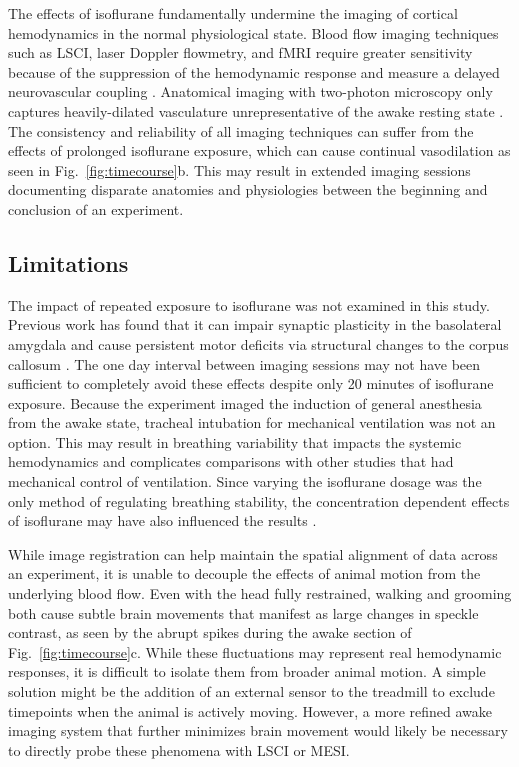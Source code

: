 \documentclass[review]{elsarticle}
\begin{document}
The effects of isoflurane fundamentally undermine the imaging of cortical hemodynamics in the normal physiological state. Blood flow imaging techniques such as LSCI, laser Doppler flowmetry, and fMRI require greater sensitivity because of the suppression of the hemodynamic response \cite{Takuwa:2012ee} and measure a delayed neurovascular coupling \cite{Pisauro:2013cx}. Anatomical imaging with two-photon microscopy only captures heavily-dilated vasculature unrepresentative of the awake resting state \cite{Lyons:2016bd}. The consistency and reliability of all imaging techniques can suffer from the effects of prolonged isoflurane exposure, which can cause continual vasodilation as seen in Fig.~\ref{fig:timecourse}b. This may result in extended imaging sessions documenting disparate anatomies and physiologies between the beginning and conclusion of an experiment.



\subsection{Limitations}

The impact of repeated exposure to isoflurane was not examined in this study. Previous work has found that it can impair synaptic plasticity in the basolateral amygdala \cite{Long:2016ri} and cause persistent motor deficits via structural changes to the corpus callosum \cite{Bajwa:2018ri}. The one day interval between imaging sessions may not have been sufficient to completely avoid these effects despite only 20 minutes of isoflurane exposure. Because the experiment imaged the induction of general anesthesia from the awake state, tracheal intubation for mechanical ventilation was not an option. This may result in breathing variability that impacts the systemic hemodynamics and complicates comparisons with other studies that had mechanical control of ventilation. Since varying the isoflurane dosage was the only method of regulating breathing stability, the concentration dependent effects of isoflurane may have also influenced the results \cite{Masamoto:2009dd,Li:2014eh}.

While image registration can help maintain the spatial alignment of data across an experiment, it is unable to decouple the effects of animal motion from the underlying blood flow. Even with the head fully restrained, walking and grooming both cause subtle brain movements that manifest as large changes in speckle contrast, as seen by the abrupt spikes during the awake section of Fig.~\ref{fig:timecourse}c. While these fluctuations may represent real hemodynamic responses, it is difficult to isolate them from broader animal motion. A simple solution might be the addition of an external sensor to the treadmill \cite{Dombeck:2007gr} to exclude timepoints when the animal is actively moving. However, a more refined awake imaging system that further minimizes brain movement would likely be necessary to directly probe these phenomena with LSCI or MESI.
\end{document}
